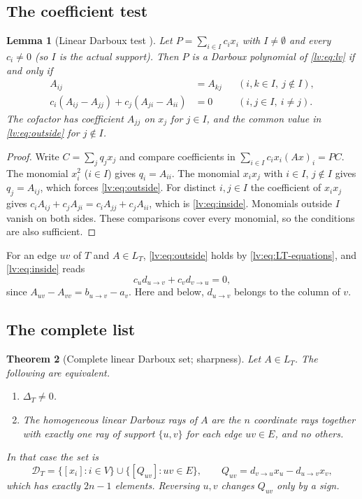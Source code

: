 \documentclass[11pt,a4paper]{article}
\newtheorem{theorem}{Theorem}[section]
\newtheorem{lemma}[theorem]{Lemma}
\theoremstyle{definition}
\theoremstyle{remark}
\begin{document}
\subsection{The coefficient test}

\begin{lemma}[Linear Darboux test {\cite[Lemma~2]{lv:K2025}}]
\label{lv:lem:dp-test}
Let $P=\sum_{i\in I}c_i x_i$ with $I\neq\emptyset$ and every $c_i\neq0$ (so $I$ is the actual support). Then $P$ is a Darboux polynomial of \eqref{lv:eq:lv} if and only if
\begin{align}
 A_{ij}&=A_{kj}
 &&(i,k\in I,\ j\notin I),
 \label{lv:eq:outside}
 \\
 c_i(A_{ij}-A_{jj})+c_j(A_{ji}-A_{ii})&=0
 &&(i,j\in I,\ i\neq j).
 \label{lv:eq:inside}
\end{align}
The cofactor has coefficient $A_{jj}$ on $x_j$ for $j\in I$, and the common value in \eqref{lv:eq:outside} for $j\notin I$.
\end{lemma}

\begin{proof}
Write $C=\sum_j q_jx_j$ and compare coefficients in $\sum_{i\in I}c_ix_i(Ax)_i=PC$. The monomial $x_i^2$ ($i\in I$) gives $q_i=A_{ii}$. The monomial $x_ix_j$ with $i\in I$, $j\notin I$ gives $q_j=A_{ij}$, which forces \eqref{lv:eq:outside}. For distinct $i,j\in I$ the coefficient of $x_ix_j$ gives $c_iA_{ij}+c_jA_{ji}=c_iA_{jj}+c_jA_{ii}$, which is \eqref{lv:eq:inside}. Monomials outside $I$ vanish on both sides. These comparisons cover every monomial, so the conditions are also sufficient.
\end{proof}

For an edge $uv$ of $T$ and $A\in L_T$, \eqref{lv:eq:outside} holds by \eqref{lv:eq:LT-equations}, and \eqref{lv:eq:inside} reads
\begin{equation}
 c_u d_{u\to v}+c_v d_{v\to u}=0,
 \label{lv:eq:edge-equation}
\end{equation}
since $A_{uv}-A_{vv}=b_{u\to v}-a_v$. Here and below, $d_{u\to v}$ belongs to the column of $v$.

\subsection{The complete list}

\begin{theorem}[Complete linear Darboux set; sharpness]
\label{lv:thm:complete}
Let $A\in L_T$. The following are equivalent.
\begin{enumerate}
\item $\Delta_T\neq0$.
\item The homogeneous linear Darboux rays of $A$ are the $n$ coordinate rays together with exactly one ray of support $\{u,v\}$ for each edge $uv\in E$, and no others.
\end{enumerate}
In that case the set is
\begin{equation}
 \mathcal D_T=
 \{[x_i]:i\in V\}
 \cup
 \{[Q_{uv}]:uv\in E\},
 \qquad
 Q_{uv}=d_{v\to u}x_u-d_{u\to v}x_v,
 \label{lv:eq:full-dp-set}
\end{equation}
which has exactly $2n-1$ elements. Reversing $u,v$ changes $Q_{uv}$ only by a sign.
\end{theorem}
\end{document}
